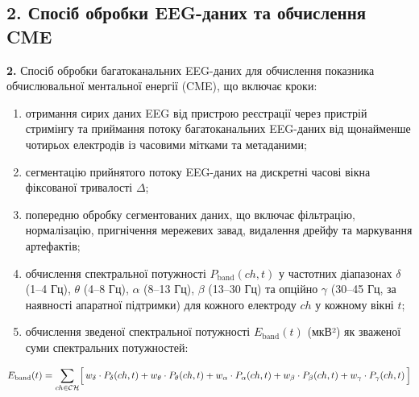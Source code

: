 \documentclass[12pt,a4paper]{article}
\begin{document}
\subsection{2. Спосіб обробки EEG-даних та обчислення CME}\label{ux441ux43fux43eux441ux456ux431-ux43eux431ux440ux43eux431ux43aux438-eeg-ux434ux430ux43dux438ux445-ux442ux430-ux43eux431ux447ux438ux441ux43bux435ux43dux43dux44f-cme}



\textbf{2.} Спосіб обробки багатоканальних EEG-даних для обчислення показника обчислювальної ментальної енергії (CME), що включає кроки:



\begin{enumerate}

\def\labelenumi{(\roman{enumi})}

\item

  отримання сирих даних EEG від пристрою реєстрації через пристрій стримінгу та приймання потоку багатоканальних EEG-даних від щонайменше чотирьох електродів із часовими мітками та метаданими;

\item

  сегментацію прийнятого потоку EEG-даних на дискретні часові вікна фіксованої тривалості \(\Delta\);

\item

  попередню обробку сегментованих даних, що включає фільтрацію, нормалізацію, пригнічення мережевих завад, видалення дрейфу та маркування артефактів;

\item

  обчислення спектральної потужності \(P_{\text{band}}(ch, t)\) у частотних діапазонах \(\delta\) (1--4 Гц), \(\theta\) (4--8 Гц), \(\alpha\) (8--13 Гц), \(\beta\) (13--30 Гц) та опційно \(\gamma\) (30--45 Гц, за наявності апаратної підтримки) для кожного електроду \(ch\) у кожному вікні \(t\);

\item

  обчислення зведеної спектральної потужності \(E_{\text{band}}(t)\) (мкВ²) як зваженої суми спектральних потужностей:

\end{enumerate}



\[E_{\text{band}}(t) = \sum_{ch \in \mathcal{CH}} \Bigl[\,w_\delta \cdot P_\delta(ch,t) + w_\theta \cdot P_\theta(ch,t) + w_\alpha \cdot P_\alpha(ch,t) + w_\beta \cdot P_\beta(ch,t) + w_\gamma \cdot P_\gamma(ch,t)\,\Bigr]\]
\end{document}
